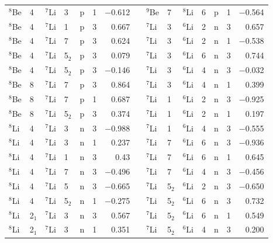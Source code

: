 \documentclass[10pt]{iopart}
\begin{document}
\begin{table}[tp]
\begin{tabular*}{\textwidth}{@{\extracolsep{\fill}}llllllrl@{\extracolsep{\fill}}llllllr@{\extracolsep{\fill}}}
$^8$Be  & 4  & $^7$Li   & 3   & p       & 1   & $-$0.612 &  & $^9$Be  & 7  & $^8$Li    & 6   & p       & 1   & $-$0.564  \\
$^8$Be  & 4  & $^7$Li   & 1   & p       & 3   & 0.667  &  & $^7$Li  & 3  & $^6$Li   & 2   & n       & 3   & 0.657   \\
$^8$Be  & 4  & $^7$Li   & 7   & p       & 3   & 0.624  &  & $^7$Li  & 3  & $^6$Li   & 2   & n       & 1   & $-$0.538  \\
$^8$Be  & 4  & $^7$Li   & 5$_2$   & p       & 3   & 0.079  &  & $^7$Li  & 3  & $^6$Li   & 6   & n       & 3   & 0.744   \\
$^8$Be  & 4  & $^7$Li   & 5$_2$   & p       & 3   & $-$0.146 &  & $^7$Li  & 3  & $^6$Li   & 4   & n       & 3   & $-$0.032  \\
$^8$Be  & 8  & $^7$Li   & 7   & p       & 3   & 0.864  &  & $^7$Li  & 3  & $^6$Li   & 4   & n       & 1   & 0.399   \\
$^8$Be  & 8  & $^7$Li   & 7   & p       & 1   & 0.687  &  & $^7$Li  & 1  & $^6$Li   & 2   & n       & 3   & $-$0.925  \\
$^8$Be  & 8  & $^7$Li   & 5$_2$   & p       & 3   & 0.374  &  & $^7$Li  & 1  & $^6$Li   & 2   & n       & 1   & 0.197   \\
$^8$Li  & 4  & $^7$Li   & 3   & n       & 3   & $-$0.988 &  & $^7$Li  & 1  & $^6$Li   & 4   & n       & 3   & $-$0.555  \\
$^8$Li  & 4  & $^7$Li   & 3   & n       & 1   & 0.237  &  & $^7$Li  & 7  & $^6$Li   & 6   & n       & 3   & $-$0.936  \\
$^8$Li  & 4  & $^7$Li   & 1   & n       & 3   & 0.43   &  & $^7$Li  & 7  & $^6$Li   & 6   & n       & 1   & 0.645   \\
$^8$Li  & 4  & $^7$Li   & 7   & n       & 3   & $-$0.496 &  & $^7$Li  & 7  & $^6$Li   & 4   & n       & 3   & $-$0.456  \\
$^8$Li  & 4  & $^7$Li   & 5   & n       & 3   & $-$0.665 &  & $^7$Li  & 5$_2$  & $^6$Li   & 2   & n       & 3   & $-$0.650   \\
$^8$Li  & 4  & $^7$Li   & 5$_2$   & n       & 1   & $-$0.275 &  & $^7$Li  & 5$_2$  & $^6$Li   & 6   & n       & 3   & 0.732   \\
$^8$Li  & 2$_1$  & $^7$Li   & 3   & n       & 3   & 0.567  &  & $^7$Li  & 5$_2$  & $^6$Li   & 6   & n       & 1   & 0.549   \\
$^8$Li  & 2$_1$  & $^7$Li   & 3   & n       & 1   & 0.351  &  & $^7$Li  & 5$_2$  & $^6$Li   & 4   & n       & 3   & 0.200     \\

\end{tabular*}
\end{table}
\end{document}
